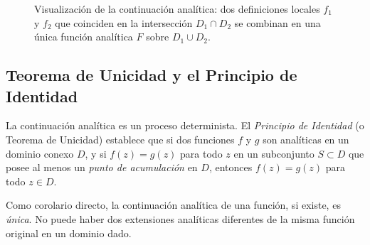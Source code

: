 \documentclass[a4paper]{article}
\begin{document}
\begin{figure}[H]
\caption{Visualización de la continuación analítica: dos definiciones locales $f_1$ y $f_2$ que coinciden en la intersección $D_1\cap D_2$ se combinan en una única función analítica $F$ sobre $D_1\cup D_2$.}
\end{figure}

\subsection*{Teorema de Unicidad y el Principio de Identidad}
La continuación analítica es un proceso determinista. El \textit{Principio de Identidad} (o Teorema de Unicidad) establece que si dos funciones $f$ y $g$ son analíticas en un dominio conexo $D$, y si $f(z) = g(z)$ para todo $z$ en un subconjunto $S \subset D$ que posee al menos un \textit{punto de acumulación} en $D$, entonces $f(z) = g(z)$ para todo $z \in D$. 

Como corolario directo, la continuación analítica de una función, si existe, es \textit{única}. No puede haber dos extensiones analíticas diferentes de la misma función original en un dominio dado.
\end{document}
